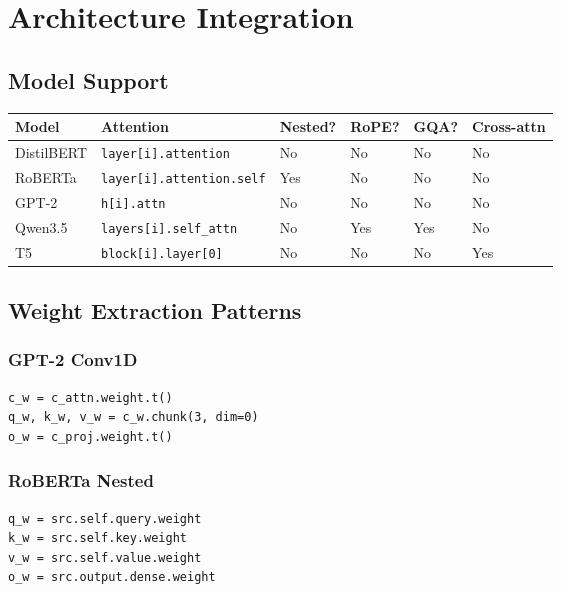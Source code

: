 \section{Architecture Integration}

\subsection{Model Support}

\begin{table}[H]
\centering
\small
\begin{tabular}{llllll}
\toprule
\textbf{Model} & \textbf{Attention} & \textbf{Nested?} & \textbf{RoPE?} & \textbf{GQA?} & \textbf{Cross-attn} \\
\midrule
DistilBERT & \texttt{layer[i].attention} & No & No & No & No \\
RoBERTa & \texttt{layer[i].attention.self} & Yes & No & No & No \\
GPT-2 & \texttt{h[i].attn} & No & No & No & No \\
Qwen3.5 & \texttt{layers[i].self\_attn} & No & Yes & Yes & No \\
T5 & \texttt{block[i].layer[0]} & No & No & No & Yes \\
\bottomrule
\end{tabular}
\end{table}

\subsection{Weight Extraction Patterns}

\subsubsection{GPT-2 Conv1D}

\begin{lstlisting}
c_w = c_attn.weight.t()
q_w, k_w, v_w = c_w.chunk(3, dim=0)
o_w = c_proj.weight.t()
\end{lstlisting}

\subsubsection{RoBERTa Nested}

\begin{lstlisting}
q_w = src.self.query.weight
k_w = src.self.key.weight
v_w = src.self.value.weight
o_w = src.output.dense.weight
\end{lstlisting}


